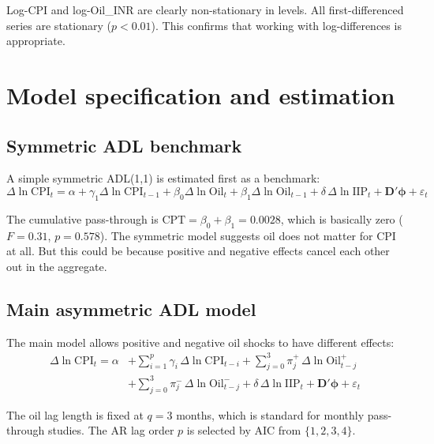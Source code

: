 \documentclass[12pt,a4paper]{article}
\begin{document}
Log-CPI and log-Oil\_INR are clearly non-stationary in levels. All first-differenced series are stationary ($p < 0.01$). This confirms that working with log-differences is appropriate.


\section{Model specification and estimation}

\subsection{Symmetric ADL benchmark}

A simple symmetric ADL(1,1) is estimated first as a benchmark:
\begin{equation}
\Delta\ln\text{CPI}_t = \alpha + \gamma_1 \Delta\ln\text{CPI}_{t-1} + \beta_0 \Delta\ln\text{Oil}_t + \beta_1 \Delta\ln\text{Oil}_{t-1} + \delta\,\Delta\ln\text{IIP}_t + \mathbf{D}'\boldsymbol{\phi} + \varepsilon_t
\end{equation}

The cumulative pass-through is $\text{CPT} = \beta_0 + \beta_1 = 0.0028$, which is basically zero ($F = 0.31$, $p = 0.578$). The symmetric model suggests oil does not matter for CPI at all. But this could be because positive and negative effects cancel each other out in the aggregate.

\subsection{Main asymmetric ADL model}

The main model allows positive and negative oil shocks to have different effects:
\begin{equation}
\begin{aligned}
\Delta\ln\text{CPI}_t = \alpha &+ \sum_{i=1}^{p}\gamma_i\,\Delta\ln\text{CPI}_{t-i} + \sum_{j=0}^{3}\pi^+_j\,\Delta\ln\text{Oil}^+_{t-j} \\
&+ \sum_{j=0}^{3}\pi^-_j\,\Delta\ln\text{Oil}^-_{t-j} + \delta\,\Delta\ln\text{IIP}_t + \mathbf{D}'\boldsymbol{\phi} + \varepsilon_t
\end{aligned}
\end{equation}

The oil lag length is fixed at $q = 3$ months, which is standard for monthly pass-through studies. The AR lag order $p$ is selected by AIC from $\{1, 2, 3, 4\}$.
\end{document}
